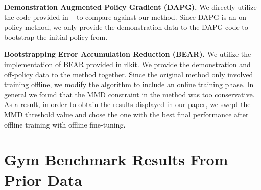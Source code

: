 \textbf{Demonstration Augmented Policy Gradient (DAPG).} We directly utilize the code provided in ~\citep{rajeswaran2018dextrous} to compare against our method. Since DAPG is an on-policy method, we only provide the demonstration data to the DAPG code to bootstrap the initial policy from.



\textbf{Bootstrapping Error Accumulation Reduction (BEAR).} We utilize the implementation of BEAR provided in \href{https://github.com/vitchyr/rlkit}{rlkit}. We provide the demonstration and off-policy data to the method together. Since the original method only involved training offline, we modify the algorithm to include an online training phase. In general we found that the MMD constraint in the method was too conservative. As a result, in order to obtain the results displayed in our paper, we swept the MMD threshold value and chose the one with the best final performance after offline training with offline fine-tuning.



\section{Gym Benchmark Results From Prior Data}
\label{sec:gym}

